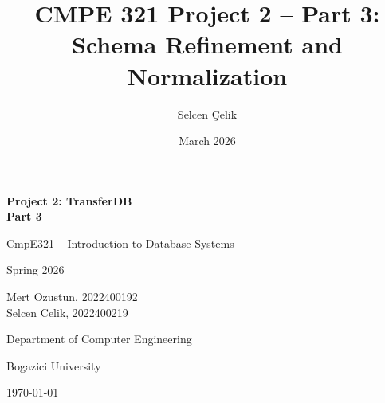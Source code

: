 \documentclass[12pt]{article}
\title{CMPE 321 Project 2 -- Part 3: Schema Refinement and Normalization}
\author{Selcen Çelik}
\date{March 2026}
\begin{document}
\begin{titlepage}
    \centering
    \vspace*{3cm}

    {\LARGE \textbf{Project 2: TransferDB \\Part 3}\par}
    \vspace{0.5cm}
    {\Large CmpE321 -- Introduction to Database Systems \par}
    {\Large Spring 2026\par}

    \vspace{2cm}

    {\large
    Mert Ozustun, 2022400192 \\
    Selcen Celik, 2022400219
    \par}

    \vspace{1cm}

    {\large Department of Computer Engineering \par}
    {\large Bogazici University \par}

    \vspace{1cm}
    {\large \today \par}
\end{titlepage}
\end{document}
